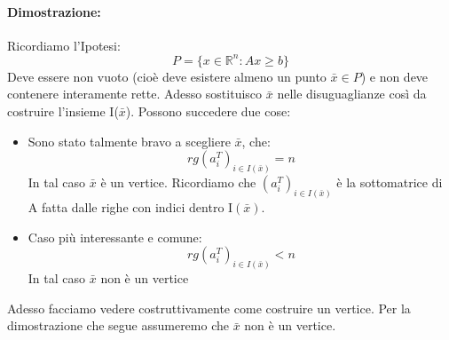 \paragraph{Dimostrazione:} Ricordiamo l'Ipotesi: 
\begin{equation*}
    P = \{x \in \mathbb{R}^n: Ax \geq b\}
\end{equation*}
Deve essere non vuoto (cioè deve esistere almeno un punto $\bar{x} \in P$) e non deve contenere interamente rette. Adesso sostituisco $\bar{x}$ nelle disuguaglianze così da costruire l'insieme I($\bar{x}$). Possono succedere due cose: 
\begin{itemize}
    \item Sono stato talmente bravo a scegliere $\bar{x}$, che:
    \begin{equation*}
        rg(a_i^T)_{i\in I(\bar{x})} = n
    \end{equation*}
    In tal caso $\bar{x}$ è un vertice. Ricordiamo che $(a_i^T)_{i\in I(\bar{x})}$ è la sottomatrice di A fatta dalle righe con indici dentro I$(\bar{x})$. 
    \item Caso più interessante e comune:
    \begin{equation*}
        rg(a_i^T)_{i\in I(\bar{x})} < n
    \end{equation*}
    In tal caso $\bar{x}$ non è un vertice
\end{itemize}
Adesso facciamo vedere costruttivamente come costruire un vertice. Per la dimostrazione che segue assumeremo che $\bar{x}$ non è un vertice.

\vspace{1cm} 

